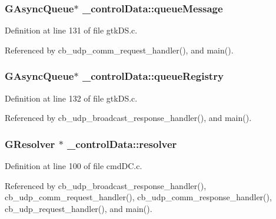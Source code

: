 \subsubsection[{queue\+Message}]{\setlength{\rightskip}{0pt plus 5cm}G\+Async\+Queue$\ast$ \+\_\+control\+Data\+::queue\+Message}\label{struct__control_data_adc74ddf3f6a7535eee87d39ed80ee7dd}


Definition at line 131 of file gtk\+D\+S.\+c.



Referenced by cb\+\_\+udp\+\_\+comm\+\_\+request\+\_\+handler(), and main().

\hypertarget{struct__control_data_a09b9467cd00be5a9ecac2386429ab65a}{}
\subsubsection[{queue\+Registry}]{\setlength{\rightskip}{0pt plus 5cm}G\+Async\+Queue$\ast$ \+\_\+control\+Data\+::queue\+Registry}\label{struct__control_data_a09b9467cd00be5a9ecac2386429ab65a}


Definition at line 132 of file gtk\+D\+S.\+c.



Referenced by cb\+\_\+udp\+\_\+broadcast\+\_\+response\+\_\+handler(), and main().

\hypertarget{struct__control_data_afe33a7083e1ecc9ba50a69644ed4a753}{}
\subsubsection[{resolver}]{\setlength{\rightskip}{0pt plus 5cm}G\+Resolver $\ast$ \+\_\+control\+Data\+::resolver}\label{struct__control_data_afe33a7083e1ecc9ba50a69644ed4a753}


Definition at line 100 of file cmd\+D\+C.\+c.



Referenced by cb\+\_\+udp\+\_\+broadcast\+\_\+response\+\_\+handler(), cb\+\_\+udp\+\_\+comm\+\_\+request\+\_\+handler(), cb\+\_\+udp\+\_\+comm\+\_\+response\+\_\+handler(), cb\+\_\+udp\+\_\+request\+\_\+handler(), and main().

\hypertarget{struct__control_data_a796910b4ad0830538301efd69811c2c6}{}

